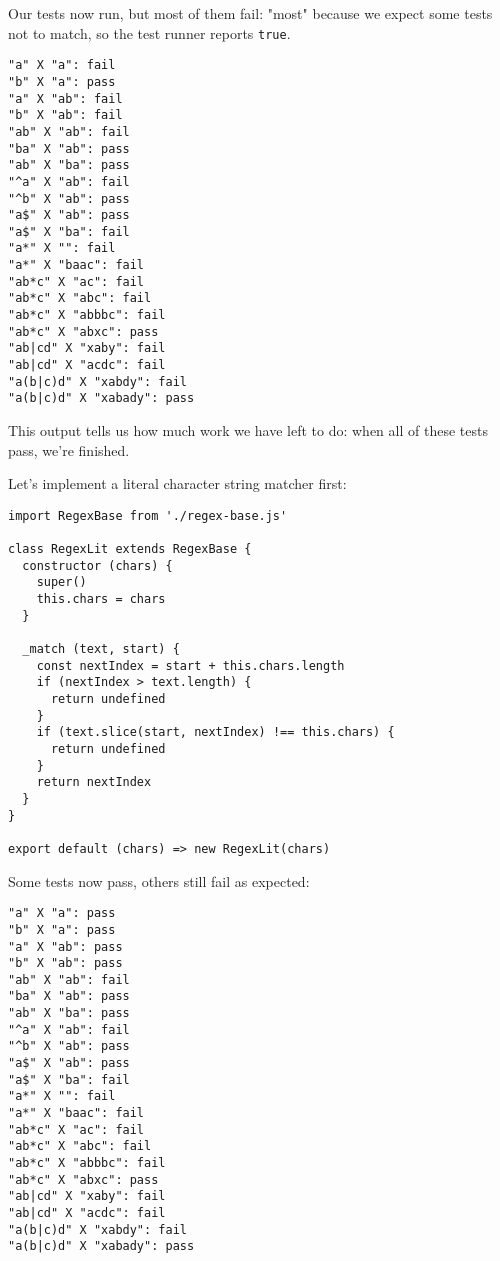 \documentclass[krantzl]{krantz}
\begin{document}
\noindent Our tests now run, but most of them fail:
"most" because we expect some tests not to match,
so the test runner reports \texttt{true}.


\begin{lstlisting}[frame=single,frameround=tttt]
"a" X "a": fail
"b" X "a": pass
"a" X "ab": fail
"b" X "ab": fail
"ab" X "ab": fail
"ba" X "ab": pass
"ab" X "ba": pass
"^a" X "ab": fail
"^b" X "ab": pass
"a$" X "ab": pass
"a$" X "ba": fail
"a*" X "": fail
"a*" X "baac": fail
"ab*c" X "ac": fail
"ab*c" X "abc": fail
"ab*c" X "abbbc": fail
"ab*c" X "abxc": pass
"ab|cd" X "xaby": fail
"ab|cd" X "acdc": fail
"a(b|c)d" X "xabdy": fail
"a(b|c)d" X "xabady": pass
\end{lstlisting}



\noindent This output tells us how much work we have left to do:
when all of these tests pass,
we're finished.


Let's implement a literal character string matcher first:


\begin{lstlisting}[frame=single,frameround=tttt]
import RegexBase from './regex-base.js'

class RegexLit extends RegexBase {
  constructor (chars) {
    super()
    this.chars = chars
  }

  _match (text, start) {
    const nextIndex = start + this.chars.length
    if (nextIndex > text.length) {
      return undefined
    }
    if (text.slice(start, nextIndex) !== this.chars) {
      return undefined
    }
    return nextIndex
  }
}

export default (chars) => new RegexLit(chars)
\end{lstlisting}



Some tests now pass, others still fail as expected:


\begin{lstlisting}[frame=single,frameround=tttt]
"a" X "a": pass
"b" X "a": pass
"a" X "ab": pass
"b" X "ab": pass
"ab" X "ab": fail
"ba" X "ab": pass
"ab" X "ba": pass
"^a" X "ab": fail
"^b" X "ab": pass
"a$" X "ab": pass
"a$" X "ba": fail
"a*" X "": fail
"a*" X "baac": fail
"ab*c" X "ac": fail
"ab*c" X "abc": fail
"ab*c" X "abbbc": fail
"ab*c" X "abxc": pass
"ab|cd" X "xaby": fail
"ab|cd" X "acdc": fail
"a(b|c)d" X "xabdy": fail
"a(b|c)d" X "xabady": pass
\end{lstlisting}
\end{document}

